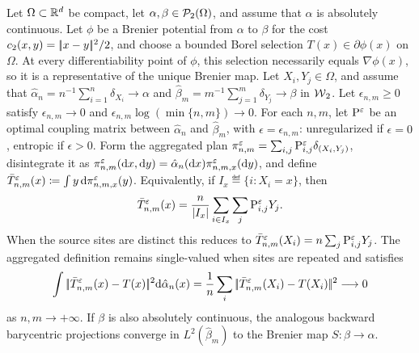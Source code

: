 \begin{prop}\label{prop-empirical-barycentric-map-consistency}
	Let \(\Omega\subset\RR^d\) be compact, let \(\alpha,\beta\in\Pp_2(\Omega)\), and assume that \(\alpha\) is absolutely continuous. Let \(\phi\) be a Brenier potential from \(\alpha\) to \(\beta\) for the cost \(c_2(x,y)=\norm{x-y}^2/2\), and choose a bounded Borel selection \(T(x)\in\partial\phi(x)\) on \(\Omega\). At every differentiability point of \(\phi\), this selection necessarily equals \(\nabla\phi(x)\), so it is a representative of the unique Brenier map. Let \(X_i,Y_j\in\Omega\), and assume that \(\hat\alpha_n=n^{-1}\sum_{i=1}^n\delta_{X_i}\to\alpha\) and \(\hat\beta_m=m^{-1}\sum_{j=1}^m\delta_{Y_j}\to\beta\) in \(\Wass_2\). Let \(\epsilon_{n,m}\geq0\) satisfy \(\epsilon_{n,m}\to0\) and \(\epsilon_{n,m}\log(\min\{n,m\})\to0\). For each \(n,m\), let \(\P^{\epsilon}\) be an optimal coupling matrix between \(\hat\alpha_n\) and \(\hat\beta_m\), with \(\epsilon=\epsilon_{n,m}\): unregularized if \(\epsilon=0\), entropic if \(\epsilon>0\). Form the aggregated plan \(\pi_{n,m}^\epsilon=\sum_{i,j}\P_{i,j}^\epsilon\delta_{(X_i,Y_j)}\), disintegrate it as \(\pi_{n,m}^\epsilon(\d x,\d y)=\hat\alpha_n(\d x)\pi_{n,m,x}^\epsilon(\d y)\), and define
	$\bar T_{n,m}^{\epsilon}(x) \eqdef \int y\,\d\pi_{n,m,x}^\epsilon(y)$.
	Equivalently, if \(I_x\eqdef\{i:X_i=x\}\), then
	\[
		\bar T_{n,m}^{\epsilon}(x)
		=
		\frac{n}{|I_x|}\sum_{i\in I_x}\sum_j\P_{i,j}^{\epsilon}Y_j.
	\]
	When the source sites are distinct this reduces to \(\bar T_{n,m}^{\epsilon}(X_i)=n\sum_j\P_{i,j}^{\epsilon}Y_j\). The aggregated definition remains single-valued when sites are repeated and satisfies
	\[
		\int \norm{\bar T_{n,m}^{\epsilon}(x)-T(x)}^2
		\d\hat\alpha_n(x)
		=
		\frac1n\sum_i \norm{\bar T_{n,m}^{\epsilon}(X_i)-T(X_i)}^2
		\longrightarrow0
	\]
	as \(n,m\to+\infty\).
	If \(\beta\) is also absolutely continuous, the analogous backward barycentric projections converge in \(L^2(\hat\beta_m)\) to the Brenier map \(S:\beta\to\alpha\).
\end{prop}

